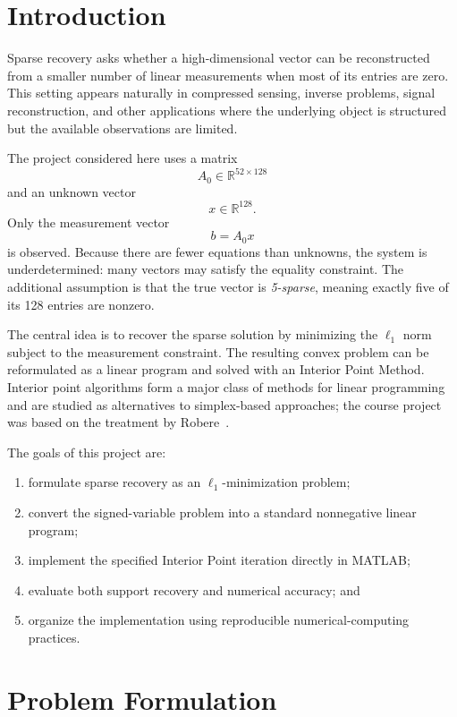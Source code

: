 \documentclass[11pt]{article}
\newcommand{\R}{\mathbb{R}}
\begin{document}
\tableofcontents
\clearpage
{}

\section{Introduction}
Sparse recovery asks whether a high-dimensional vector can be reconstructed from a smaller number of linear measurements when most of its entries are zero. This setting appears naturally in compressed sensing, inverse problems, signal reconstruction, and other applications where the underlying object is structured but the available observations are limited.

The project considered here uses a matrix
\[
A_0\in\R^{52\times 128}
\]
and an unknown vector
\[
x\in\R^{128}.
\]
Only the measurement vector
\[
b=A_0x
\]
is observed. Because there are fewer equations than unknowns, the system is underdetermined: many vectors may satisfy the equality constraint. The additional assumption is that the true vector is \emph{5-sparse}, meaning exactly five of its 128 entries are nonzero.

The central idea is to recover the sparse solution by minimizing the $\ell_1$ norm subject to the measurement constraint. The resulting convex problem can be reformulated as a linear program and solved with an Interior Point Method. Interior point algorithms form a major class of methods for linear programming and are studied as alternatives to simplex-based approaches; the course project was based on the treatment by Robere~\cite{robere2012}.

The goals of this project are:
\begin{enumerate}[leftmargin=1.5em]
  \item formulate sparse recovery as an $\ell_1$-minimization problem;
  \item convert the signed-variable problem into a standard nonnegative linear program;
  \item implement the specified Interior Point iteration directly in MATLAB;
  \item evaluate both support recovery and numerical accuracy; and
  \item organize the implementation using reproducible numerical-computing practices.
\end{enumerate}

\section{Problem Formulation}
\end{document}
